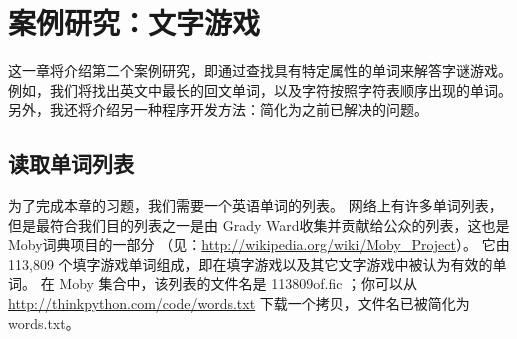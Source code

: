 

\chapter{案例研究：文字游戏}
\label{wordplay}


这一章将介绍第二个案例研究，即通过查找具有特定属性的单词来解答字谜游戏。
例如，我们将找出英文中最长的回文单词，以及字符按照字符表顺序出现的单词。
另外，我还将介绍另一种程序开发方法：简化为之前已解决的问题。

\section{读取单词列表}
\label{wordlist}

  

为了完成本章的习题，我们需要一个英语单词的列表。
网络上有许多单词列表，但是最符合我们目的列表之一是由 Grady
Ward收集并贡献给公众的列表，这也是Moby词典项目的一部分
（见：\url{http://wikipedia.org/wiki/Moby_Project}）。
它由 113,809 个填字游戏单词组成，即在填字游戏以及其它文字游戏中被认为有效的单词。
在 Moby 集合中，该列表的文件名是 113809of.fic ；你可以从 \url{http://thinkpython.com/code/words.txt} 下载一个拷贝，文件名已被简化为 words.txt。
  

